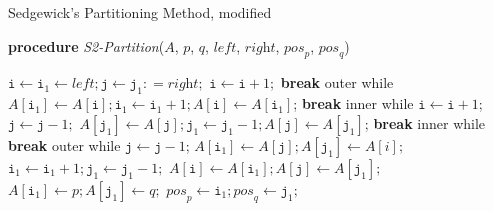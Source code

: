 \documentclass[prodmode,acmtalg]{acmsmall}
\begin{document}
\begin{algorithm}
    \caption{Sedgewick's Partitioning Method, modified}\samepage\label{algo:sedgewick:partition:modified}
    \textbf{procedure} \textit{S2-Partition}($\textit{A}$,
		$\textit{p}$, $\textit{q}$, $\textit{left}$,
		$\textit{right}$, $\textit{pos}_{\textit{p}}$, $\textit{pos}_{\textit{q}}$)
    \begin{algorithmic}[1]
		  \State $\texttt{i} \gets \texttt{i}_1 \gets \textit{left}; \texttt{j} \gets \texttt{j}_1 : = \textit{right};$
                  \State $\texttt{i} \gets \texttt{i} + 1;$
                  \State \textbf{break} outer while
                  \EndIf
                \State $\textit{A}[\texttt{i}_1] \gets \textit{A}[\texttt{i}]; \texttt{i}_1 \gets \texttt{i}_1 + 1; \textit{A}[\texttt{i}] \gets \textit{A}[\texttt{i}_1]$;
                 \State \textbf{break} inner while
                 \EndIf
		 \State $\texttt{i} \gets \texttt{i} + 1$;
		 \EndWhile
                 \State $\texttt{j} \gets \texttt{j} - 1;$
                 \State $\textit{A}[\texttt{j}_1] \gets \textit{A}[\texttt{j}]; \texttt{j}_1 \gets \texttt{j}_1 - 1; \textit{A}[\texttt{j}] \gets \textit{A}[\texttt{j}_1]$;
                 \State \textbf{break} inner while
                 \EndIf
                 \State \textbf{break} outer while
                 \EndIf
		 \State $\texttt{j} \gets \texttt{j} - 1$;
		 \EndWhile
                 \State $\textit{A}[\texttt{i}_1] \gets \textit{A}[\texttt{j}]; \textit{A}[\texttt{j}_1] \gets \textit{A}[i];$
		 \State $\texttt{i}_1 \gets \texttt{i}_1 + 1; \texttt{j}_1 \gets \texttt{j}_1 - 1;$
		 \State $\textit{A}[\texttt{i}] \gets \textit{A}[\texttt{i}_1]; \textit{A}[\texttt{j}] \gets \textit{A}[\texttt{j}_1];$
		 \EndWhile
                 \State $\textit{A}[\texttt{i}_1] \gets \textit{p}; \textit{A}[\texttt{j}_1] \gets \textit{q};$
		 \State $\textit{pos}_{\textit{p}} \gets \texttt{i}_1;  \textit{pos}_{\textit{q}} \gets \texttt{j}_1;$
            \end{algorithmic}
            \end{algorithm}
\end{document}
